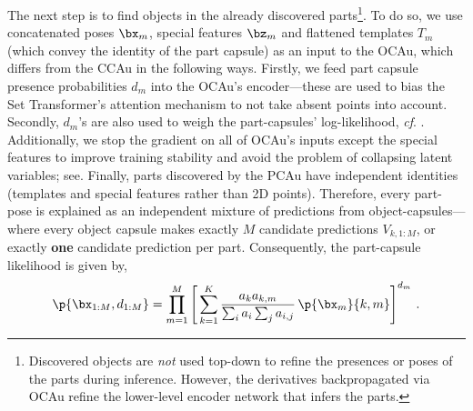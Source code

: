 The next step is to find objects in the already discovered parts\footnote{
    Discovered objects are {\it not} used top-down to refine the presences or poses of the parts during inference. However, the derivatives backpropagated via \gls{OCAu} refine the lower-level encoder network that infers the parts.
}.
To do so, we use concatenated poses $\bx_m$, special features $\bz_m$ and flattened templates $T_m$ (which convey the identity of the part capsule)
as an input to the \gls{OCAu}, which differs from the \gls{CCAu} in the following ways.
Firstly, we feed part capsule presence probabilities $d_m$ into the \gls{OCAu}'s encoder---these are used to bias the Set Transformer's attention mechanism to not take absent points into account.
Secondly, $d_m$'s are also used to weigh the part-capsules' log-likelihood, \textit{cf}. .
Additionally, we stop the gradient on all of \gls{OCAu}'s inputs except the special features to improve training stability and avoid the problem of collapsing latent variables; see\eg \cite{Rasmus2015ladder}.
Finally, parts discovered by the \gls{PCAu} have independent identities (templates and special features rather than 2D points).
Therefore, every part-pose is explained as an independent mixture of predictions from object-capsules---where every object capsule makes exactly $M$ candidate predictions $V_{k,1:M}$, or exactly {\bf one} candidate prediction per part.
Consequently, the part-capsule likelihood is given by,
\begin{equation}
    \p{\bx_{1:M}, d_{1:M}} = \prod_{m=1}^M \left[\, \sum_{k=1}^K  
    \frac{a_k a_{k,m}}{\sum_i a_i \sum_j a_{i,j}}
    \,\p{\bx_m}{k,m}\right]^{d_m}\,. \label{eq:mod_constellation_likelihood}
\end{equation}


